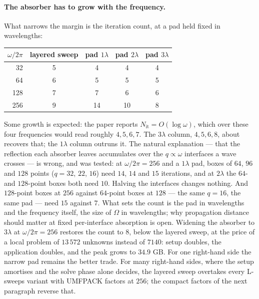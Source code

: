 \documentclass[11pt]{article}
\newcommand{\Om}{\Omega}
\begin{document}
\paragraph{The absorber has to grow with the frequency.} What narrows the margin is the
iteration count, at a pad held fixed in wavelengths:
\begin{center}\small
\begin{tabular}{rcccc}
\toprule
$\omega/2\pi$ & layered sweep & pad $1\lambda$ & pad $2\lambda$ & pad $3\lambda$ \\
\midrule
 32 & 5 & 4 & 4 & 4 \\
 64 & 6 & 5 & 5 & 5 \\
128 & 7 & 7 & 6 & 6 \\
256 & 9 & 14 & 10 & 8 \\
\bottomrule
\end{tabular}
\end{center}
Some growth is expected: the paper reports $N_{\mathrm{it}}=O(\log\omega)$, which over
these four frequencies would read roughly $4,5,6,7$. The $3\lambda$ column, $4,5,6,8$,
about recovers that; the $1\lambda$ column outruns it. The natural explanation
--- that the reflection each absorber leaves accumulates over the $q\propto\omega$
interfaces a wave crosses --- is wrong, and was tested: at $\omega/2\pi=256$ and a
$1\lambda$ pad, boxes of $64$, $96$ and $128$ points ($q=32$, $22$, $16$) need $14$, $14$
and $15$ iterations, and at $2\lambda$ the $64$- and $128$-point boxes both need $10$.
Halving the interfaces changes nothing. And $128$-point boxes at $256$ against $64$-point
boxes at $128$ --- the same $q=16$, the same pad --- need $15$ against $7$. What sets the
count is the pad in wavelengths and the frequency itself, the size of $\Om$ in
wavelengths; why propagation distance should matter at fixed per-interface absorption is
open. Widening the absorber to $3\lambda$ at
$\omega/2\pi=256$ restores the count to $8$, below the layered sweep, at the price of a
local problem of $13\,572$ unknowns instead of $7140$: setup doubles, the application doubles,
and the peak grows to $34.9$ GB. For one right-hand side the narrow pad remains the better
trade. For many right-hand sides, where the setup amortises and the solve phase alone
decides, the layered sweep overtakes every L-sweeps variant with UMFPACK factors at $256$;
the compact factors of the next paragraph reverse that.
\end{document}
